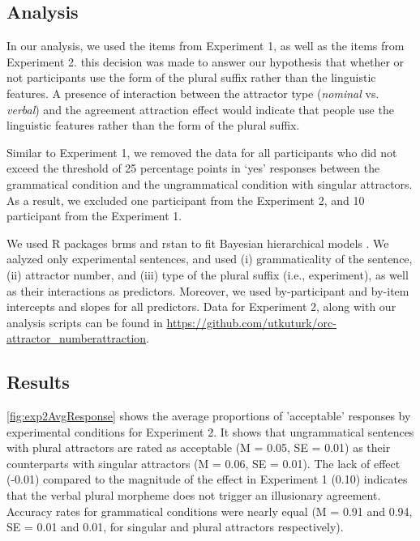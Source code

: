 \documentclass[doc,a4paper,man,natbib,floatsintext,noextraspace]{apa6}\usepackage[]{graphicx}\usepackage[]{color}
\begin{document}
\subsection{Analysis} \label{sec:exp2:analysis}





In our analysis, we used the items from Experiment 1, as well as the items from Experiment 2. this decision was made to answer our hypothesis that whether or not participants use the form of the plural suffix rather than the linguistic features. A presence of interaction between the attractor type (\textit{nominal} vs. \textit{verbal}) and the agreement attraction effect would indicate that people use the linguistic features rather than the form of the plural suffix. 

Similar to Experiment 1, we removed the data for all participants who did not exceed the threshold of 25 percentage points in `yes' responses between the grammatical condition and the ungrammatical condition with singular attractors. As a result, we excluded  one participant from the Experiment 2, and 10 participant from the Experiment 1.

We used R packages brms \citep{R-brms_b} and rstan \citep{R-stan} to fit Bayesian hierarchical models \citep[e.g.,][]{GelmanHill:2007}. We aalyzed only experimental sentences, and used (i) grammaticality of the sentence, (ii) attractor number, and (iii) type of the plural suffix (i.e., experiment), as well as their interactions as predictors. 
Moreover, we used by-participant and by-item intercepts and slopes for all predictors.
Data for Experiment 2, along with our analysis scripts can be found in \url{https://github.com/utkuturk/orc-attractor_numberattraction}.


\subsection{Results} \label{sec:exp2:results}






\autoref{fig:exp2AvgResponse} shows the average proportions of 'acceptable' responses by experimental conditions for Experiment 2. 
It shows that ungrammatical sentences with plural attractors are rated as acceptable 
(M = 0.05, 
SE = 0.01) 
as their counterparts with singular attractors 
(M = 0.06, 
SE = 0.01). The lack of effect (-0.01) compared to the magnitude of the effect in Experiment 1 (0.10) indicates that the verbal plural morpheme does not trigger an illusionary agreement.
%
Accuracy rates for grammatical conditions were nearly equal
(M = 0.91 and 0.94, 
SE = 0.01 and 0.01, for singular and plural attractors respectively). 
\end{document}

